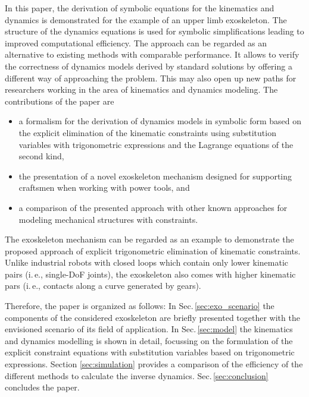 \documentclass{svproc}
\begin{document}
In this paper, the derivation of symbolic equations for the kinematics and dynamics is demonstrated for the example of an upper limb exoskeleton.
The structure of the dynamics equations is used for symbolic simplifications leading to improved computational efficiency.
The approach can be regarded as an alternative to existing methods with comparable performance.
It allows to verify the correctness of dynamics models derived by standard solutions by offering a different way of approaching the problem.
This may also open up new paths for researchers working in the area of kinematics and dynamics modeling. 
The contributions of the paper are

\vspace{-0.20cm}

\begin{itemize}
    \item a formalism for the derivation of dynamics models in symbolic form based on the explicit elimination of the kinematic constraints using substitution variables with trigonometric expressions and the Lagrange equations of the second kind,
    \item the presentation of a novel exoskeleton mechanism designed for supporting craftsmen when working with power tools, and
    \item a comparison of the presented approach with other known approaches for modeling mechanical structures with constraints.
\end{itemize}
\vspace{-0.25cm}
The exoskeleton mechanism can be regarded as an example to demonstrate the proposed approach of explicit trigonometric elimination of kinematic constraints.
Unlike industrial robots with closed loops which contain only lower kinematic pairs (i.\,e., single-DoF joints), the exoskeleton also comes with higher kinematic pars (i.\,e., contacts along a curve generated by gears).

Therefore, the paper is organized as follows:
In Sec.\,\ref{sec:exo_scenario} the components of the considered exoskeleton are briefly presented together with the envisioned scenario of its field of application. In Sec.\,\ref{sec:model} the kinematics and dynamics modelling is shown in detail, focussing on the formulation of the explicit constraint equations with substitution variables based on trigonometric expressions.
Section \ref{sec:simulation} provides a comparison of the efficiency of the different methods to calculate the inverse dynamics. Sec.\,\ref{sec:conclusion} concludes the paper.
\end{document}
